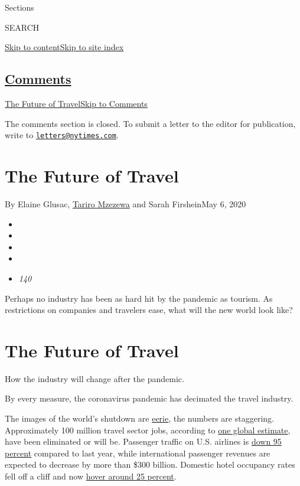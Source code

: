 Sections

SEARCH

\protect\hyperlink{site-content}{Skip to
content}\protect\hyperlink{site-index}{Skip to site index}

\hypertarget{comments}{%
\subsection{\texorpdfstring{\protect\hyperlink{commentsContainer}{Comments}}{Comments}}\label{comments}}

\href{}{The Future of Travel}\href{}{Skip to Comments}

The comments section is closed. To submit a letter to the editor for
publication, write to
\href{mailto:letters@nytimes.com}{\nolinkurl{letters@nytimes.com}}.

\hypertarget{the-future-of-travel}{%
\section{The Future of Travel}\label{the-future-of-travel}}

By Elaine Glusac,
\href{https://www.nytimes.com/by/tariro-mzezewa}{Tariro Mzezewa} and
Sarah FirsheinMay 6, 2020

\begin{itemize}
\item
\item
\item
\item
\item
  \emph{140}
\end{itemize}

Perhaps no industry has been as hard hit by the pandemic as tourism. As
restrictions on companies and travelers ease, what will the new world
look like?

\hypertarget{the-future-of-travel-1}{%
\section{The Future of Travel}\label{the-future-of-travel-1}}

How the industry will change after the pandemic.

By every measure, the coronavirus pandemic has decimated the travel
industry.

The images of the world's shutdown are
\href{https://www.nytimes.com/2020/02/27/world/europe/milan-coronavirus.html}{eerie},
the numbers are staggering. Approximately 100 million travel sector
jobs, according to
\href{https://wttc.org/News-Article/WTTC-now-estimates-over-100-million-jobs-losses-in-the-Travel-\&-Tourism-sector-and-alerts-G20-countries-to-the-scale-of-the-crisis}{one
global estimate}, have been eliminated or will be. Passenger traffic on
U.S. airlines is
\href{https://www.nytimes.com/2020/04/14/business/coronavirus-airlines-bailout-treasury-department.html}{down
95 percent} compared to last year, while international passenger
revenues are expected to decrease by more than \$300 billion. Domestic
hotel occupancy rates fell off a cliff and now
\href{https://str.com/press-release/str-us-hotel-results-week-ending-25-april}{hover
around 25 percent}.

